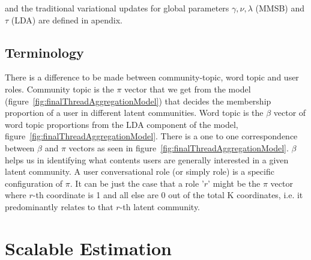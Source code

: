 \documentclass{sig-alternate}
\begin{document}
\normalsize
and the traditional variational updates for global parameters $\gamma, \nu, \lambda$
(MMSB) and $\tau$ (LDA) are defined in apendix.
\vspace*{-0.5\baselineskip}
\subsection{Terminology} 
\label{sec:term}
There is a difference to be made between
community-topic, word topic and user roles. Community topic is the 
$\pi$ vector that we get from
the model (figure~\ref{fig:finalThreadAggregationModel}) that decides the 
membership proportion of a user in
different latent communities. Word topic is the $\beta$ vector of word topic
proportions from the LDA component of the model,
figure~\ref{fig:finalThreadAggregationModel}. There is a one to one
correspondence between $\beta$ and $\pi$ vectors as seen in
figure~\ref{fig:finalThreadAggregationModel}. $\beta$ helps us in identifying
what contents users are generally interested in a given latent community.
 A user conversational role (or simply role) is a specific 
 configuration of $\pi$. It can be just the case
that a role '$r$' might be the $\pi$ vector where $r$-th coordinate is 1
and all else are 0 out of the total K coordinates, i.e. it predominantly relates
to that $r$-th latent community.


\section{Scalable Estimation}
\label{estimation}
\end{document}
